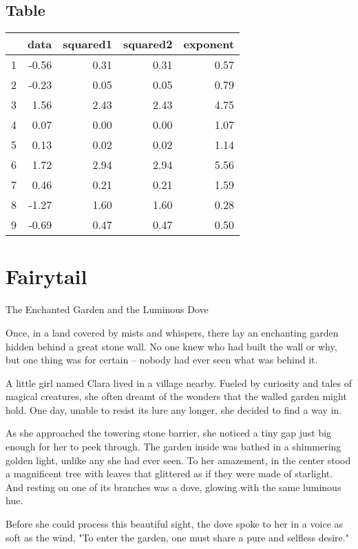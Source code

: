 \documentclass[10pt, a4paper, titlepage]{article}
\begin{document}
\subsection{Table}
\begin{table}[ht]
\centering
\begin{tabular}{rrrrr}
  \hline
 & data & squared1 & squared2 & exponent \\ 
  \hline
  1 & -0.56 & 0.31 & 0.31 & 0.57 \\ 
  2 & -0.23 & 0.05 & 0.05 & 0.79 \\ 
  3 & 1.56 & 2.43 & 2.43 & 4.75 \\ 
  4 & 0.07 & 0.00 & 0.00 & 1.07 \\ 
  5 & 0.13 & 0.02 & 0.02 & 1.14 \\ 
  6 & 1.72 & 2.94 & 2.94 & 5.56 \\ 
  7 & 0.46 & 0.21 & 0.21 & 1.59 \\ 
  8 & -1.27 & 1.60 & 1.60 & 0.28 \\ 
  9 & -0.69 & 0.47 & 0.47 & 0.50 \\ 
   \hline
\end{tabular}
\end{table}

\newpage

\section{Fairytail}
The Enchanted Garden and the Luminous Dove

Once, in a land covered by mists and whispers, there lay an enchanting garden hidden behind a great stone wall. No one knew who had built the wall or why, but one thing was for certain – nobody had ever seen what was behind it.

A little girl named Clara lived in a village nearby. Fueled by curiosity and tales of magical creatures, she often dreamt of the wonders that the walled garden might hold. One day, unable to resist its lure any longer, she decided to find a way in.

As she approached the towering stone barrier, she noticed a tiny gap just big enough for her to peek through. The garden inside was bathed in a shimmering golden light, unlike any she had ever seen. To her amazement, in the center stood a magnificent tree with leaves that glittered as if they were made of starlight. And resting on one of its branches was a dove, glowing with the same luminous hue.

Before she could process this beautiful sight, the dove spoke to her in a voice as soft as the wind, "To enter the garden, one must share a pure and selfless desire."
\end{document}
